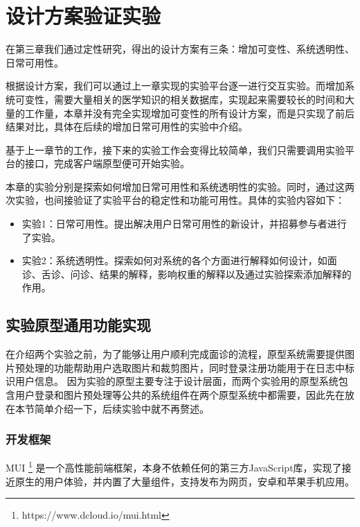 \chapter{设计方案验证实验}


在第三章我们通过定性研究，得出的设计方案有三条：增加可变性、系统透明性、日常可用性。

根据设计方案，我们可以通过上一章实现的实验平台逐一进行交互实验。而增加系统可变性，需要大量相关的医学知识的相关数据库，实现起来需要较长的时间和大量的工作量，本章并没有完全实现增加可变性的所有设计方案，而是只实现了前后结果对比，具体在后续的增加日常可用性的实验中介绍。

基于上一章节的工作，接下来的实验工作会变得比较简单，我们只需要调用实验平台的接口，完成客户端原型便可开始实验。

本章的实验分别是探索如何增加日常可用性和系统透明性的实验。同时，通过这两次实验，也间接验证了实验平台的稳定性和功能可用性。具体的实验内容如下：

\begin{itemize}
	\item 实验1：日常可用性。提出解决用户日常可用性的新设计，并招募参与者进行了实验。

	\item 实验2：系统透明性。探索如何对系统的各个方面进行解释如何设计，如面诊、舌诊、问诊、结果的解释，影响权重的解释以及通过实验探索添加解释的作用。
	
\end{itemize}

\section{实验原型通用功能实现}
在介绍两个实验之前，为了能够让用户顺利完成面诊的流程，原型系统需要提供图片预处理的功能帮助用户选取图片和裁剪图片，同时登录注册功能用于在日志中标识用户信息。
因为实验的原型主要专注于设计层面，而两个实验用的原型系统包含用户登录和图片预处理等公共的系统组件在两个原型系统中都需要，因此先在放在本节简单介绍一下，后续实验中就不再赘述。
\subsection{开发框架}
MUI \footnote{https://www.dcloud.io/mui.html} 是一个高性能前端框架，本身不依赖任何的第三方JavaScript库，实现了接近原生的用户体验，并内置了大量组件，支持发布为网页，安卓和苹果手机应用。

